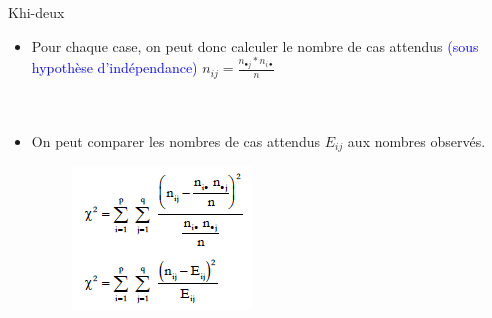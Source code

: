 \documentclass[11pt]{beamer}
\begin{document}
\begin{frame}{  Khi-deux}
\begin{itemize}
\item Pour chaque case, on peut donc calculer le nombre de cas attendus \textcolor{blue}{(sous hypothèse d’indépendance)}
$n_{ij}=\frac{n_{\bullet j}*n_{i \bullet}}{n} $\\~\\~\\

\item On peut comparer les nombres de cas attendus $E_{ij}$ aux nombres observés.

\begin{figure}
\includegraphics[scale=0.8]{Exemple6.png}  
\end{figure}
\end{itemize}
\end{frame}
\end{document}
